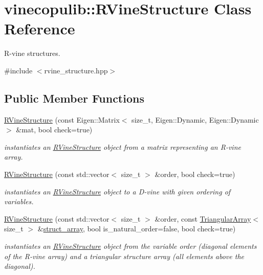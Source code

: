 \hypertarget{classvinecopulib_1_1_r_vine_structure}{}\section{vinecopulib\+:\+:R\+Vine\+Structure Class Reference}
\label{classvinecopulib_1_1_r_vine_structure}


R-\/vine structures.  




{\ttfamily \#include $<$rvine\+\_\+structure.\+hpp$>$}

\subsection*{Public Member Functions}
\begin{DoxyCompactItemize}
\item 
\hyperlink{classvinecopulib_1_1_r_vine_structure_a271688bc56e2950d5a27213f4b5f9fda}{R\+Vine\+Structure} (const Eigen\+::\+Matrix$<$ size\+\_\+t, Eigen\+::\+Dynamic, Eigen\+::\+Dynamic $>$ \&mat, bool check=true)
\begin{DoxyCompactList}\small\item\em instantiates an \hyperlink{classvinecopulib_1_1_r_vine_structure}{R\+Vine\+Structure} object from a matrix representing an R-\/vine array. \end{DoxyCompactList}\item 
\hyperlink{classvinecopulib_1_1_r_vine_structure_aa7e6b14379d8eed772e63c6944e3f610}{R\+Vine\+Structure} (const std\+::vector$<$ size\+\_\+t $>$ \&order, bool check=true)
\begin{DoxyCompactList}\small\item\em instantiates an \hyperlink{classvinecopulib_1_1_r_vine_structure}{R\+Vine\+Structure} object to a D-\/vine with given ordering of variables. \end{DoxyCompactList}\item 
\hyperlink{classvinecopulib_1_1_r_vine_structure_a0fb1958f6971b01776133af60ee20ee7}{R\+Vine\+Structure} (const std\+::vector$<$ size\+\_\+t $>$ \&order, const \hyperlink{classvinecopulib_1_1_triangular_array}{Triangular\+Array}$<$ size\+\_\+t $>$ \&\hyperlink{classvinecopulib_1_1_r_vine_structure_a00835cb9e06ca80bfff9c89100a1bb56}{struct\+\_\+array}, bool is\+\_\+natural\+\_\+order=false, bool check=true)
\begin{DoxyCompactList}\small\item\em instantiates an \hyperlink{classvinecopulib_1_1_r_vine_structure}{R\+Vine\+Structure} object from the variable order (diagonal elements of the R-\/vine array) and a triangular structure array (all elements above the diagonal). \end{DoxyCompactList}\item 

\end{DoxyCompactItemize}
